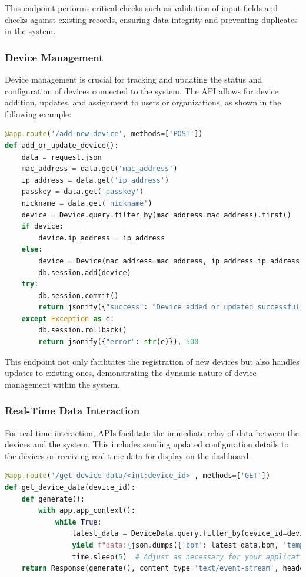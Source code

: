 \noindent This endpoint performs critical checks such as validation of input fields and checks against existing records, ensuring data integrity and preventing duplicates in the system.

\subsubsection{Device Management}

Device management is crucial for tracking and updating the status and configuration of devices connected to the system. The API allows for device addition, updates, and assignment to users or organizations, as shown in the following example:

\begin{lstlisting}[language=python, caption={API Endpoint for Adding or Updating a Device}]
@app.route('/add-new-device', methods=['POST'])
def add_or_update_device():
    data = request.json
    mac_address = data.get('mac_address')
    ip_address = data.get('ip_address')
    passkey = data.get('passkey')
    nickname = data.get('nickname')
    device = Device.query.filter_by(mac_address=mac_address).first()
    if device:
        device.ip_address = ip_address
    else:
        device = Device(mac_address=mac_address, ip_address=ip_address, nickname=nickname, passkey=passkey)
        db.session.add(device)
    try:
        db.session.commit()
        return jsonify({"success": "Device added or updated successfully", "device_id": device.id}), 201
    except Exception as e:
        db.session.rollback()
        return jsonify({"error": str(e)}), 500
\end{lstlisting}

\noindent This endpoint not only facilitates the registration of new devices but also handles updates to existing ones, demonstrating the dynamic nature of device management within the system.

\subsubsection{Real-Time Data Interaction}

For real-time interaction, APIs facilitate the immediate relay of data between the devices and the system. This includes sending updated configuration details to the devices or receiving real-time data for display on the dashboard.

\begin{lstlisting}[language=python, caption={API Endpoint for Real-Time Data Streaming}]
@app.route('/get-device-data/<int:device_id>', methods=['GET'])
def get_device_data(device_id):
    def generate():
        with app.app_context():
            while True:
                latest_data = DeviceData.query.filter_by(device_id=device_id).order_by(DeviceData.timestamp.desc()).first()
                yield f"data:{json.dumps({'bpm': latest_data.bpm, 'temperature': latest_data.temperature})}\n\n"
                time.sleep(5)  # Adjust as necessary for your application's needs
    return Response(generate(), content_type='text/event-stream', headers={'Cache-Control': 'no-cache'})
\end{lstlisting}

